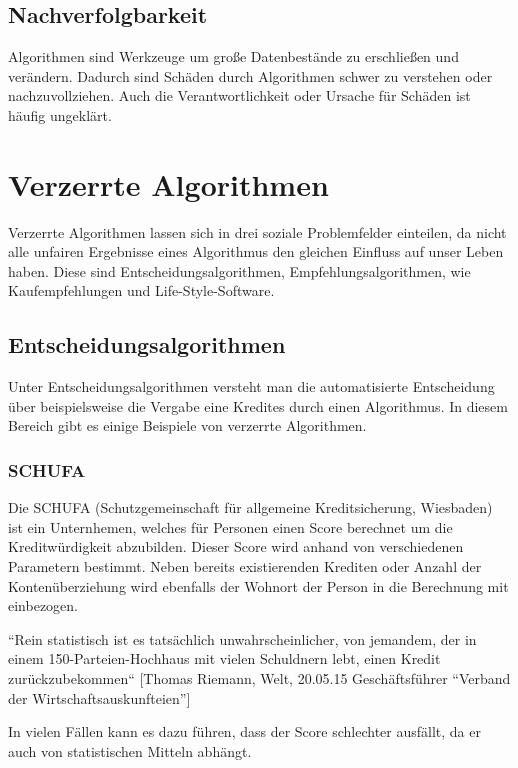 \subsection{Nachverfolgbarkeit}
Algorithmen sind Werkzeuge um große Datenbestände zu erschließen und verändern. Dadurch sind Schäden durch Algorithmen schwer zu verstehen oder nachzuvollziehen. Auch die Verantwortlichkeit oder Ursache für Schäden ist häufig ungeklärt.

\section{Verzerrte Algorithmen}

Verzerrte Algorithmen lassen sich in drei soziale Problemfelder einteilen, da nicht alle unfairen Ergebnisse eines Algorithmus den gleichen Einfluss auf unser Leben haben. 
Diese sind Entscheidungsalgorithmen, Empfehlungsalgorithmen, wie Kaufempfehlungen und Life-Style-Software.


\subsection{Entscheidungsalgorithmen}
Unter Entscheidungsalgorithmen versteht man die automatisierte Entscheidung über beispielsweise die Vergabe eine Kredites durch einen Algorithmus. In diesem Bereich gibt es einige Beispiele von verzerrte Algorithmen. 

\subsubsection{SCHUFA}
Die SCHUFA (Schutzgemeinschaft für allgemeine Kreditsicherung, Wiesbaden) ist ein Unternhemen, welches für Personen einen Score berechnet um die Kreditwürdigkeit abzubilden. Dieser Score wird anhand von verschiedenen Parametern bestimmt. Neben bereits existierenden Krediten oder Anzahl der Kontenüberziehung wird ebenfalls der Wohnort der Person in die Berechnung mit einbezogen. \newline

“Rein statistisch ist es tatsächlich unwahrscheinlicher, von jemandem, der in einem 150-Parteien-Hochhaus mit vielen Schuldnern lebt, einen Kredit zurückzubekommen“
[Thomas Riemann, Welt, 20.05.15 Geschäftsführer “Verband der Wirtschaftsauskunfteien”]

In vielen Fällen kann es dazu führen, dass der Score schlechter ausfällt, da er auch von statistischen Mitteln abhängt. \cite{welt2015}


